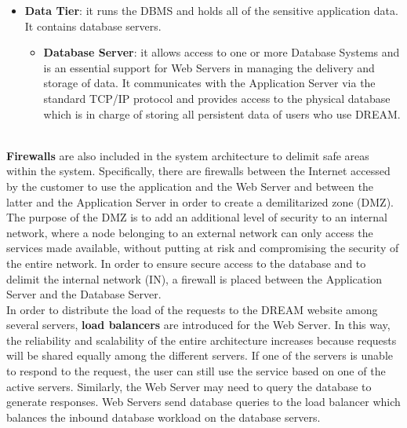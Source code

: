 \begin{itemize}
\begin{itemize}
    \end{itemize}
    \item \textbf{Data Tier}: it runs the DBMS and holds all of the sensitive application data. It contains database servers.
    \begin{itemize}
        \item \textbf{Database Server}: it allows access to one or more Database Systems and is an essential support for Web Servers in managing the delivery and storage of data. It communicates with the Application Server via the standard TCP/IP protocol and provides access to the physical database which is in charge of storing all persistent data of users who use DREAM.
    \end{itemize}
\end{itemize}\\


\textbf{Firewalls} are also included in the system architecture to delimit safe areas within the system. 
Specifically, there are firewalls between the Internet accessed by the customer to use the application and the Web Server and between the latter and the Application Server in order to create a demilitarized zone (DMZ). The purpose of the DMZ is to add an additional level of security to an internal network, where a node belonging to an external network can only access the services made available, without putting at risk and compromising the security of the entire network.
In order to ensure secure access to the database and to delimit the internal network (IN), a firewall is placed between the Application Server and the Database Server.\\


In order to distribute the load of the requests to the DREAM website among several servers, \textbf{load balancers} are introduced for the Web Server. In this way, the reliability and scalability of the entire architecture increases because requests will be shared equally among the different servers. If one of the servers is unable to respond to the request, the user can still use the service based on one of the active servers.
Similarly, the Web Server may need to query the database to generate responses. Web Servers send database queries to the load balancer which balances the inbound database workload on the database servers.



\def\fillandplacepagenumber{%
 \par\pagestyle{empty}%
\vbox to 0pt{\vss}\vfill
\vbox to 0pt{\baselineskip0pt
   \hbox to\linewidth{\hss}%
   \setlength{\footskip}{70pt}
   \baselineskip\footskip
   \hbox to\linewidth{%
     \hfil\thepage\hfil}\vss}}

